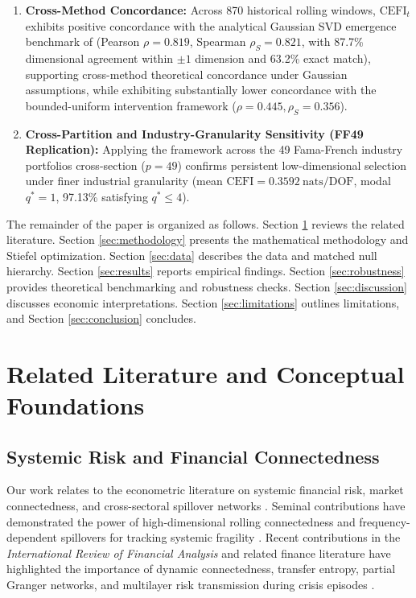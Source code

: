 \documentclass[review,12pt,authoryear]{elsarticle}
\begin{document}
\begin{enumerate}
    \item \textbf{Cross-Method Concordance:} Across 870 historical rolling windows, $\mathrm{CEFI}_t$ exhibits positive concordance with the analytical Gaussian SVD emergence benchmark of \citet{liu2025singular} (Pearson $\rho = 0.819$, Spearman $\rho_S = 0.821$, with 87.7\% dimensional agreement within $\pm 1$ dimension and 63.2\% exact match), supporting cross-method theoretical concordance under Gaussian assumptions, while exhibiting substantially lower concordance with the bounded-uniform intervention framework ($\rho = 0.445, \rho_S = 0.356$).
    \item \textbf{Cross-Partition and Industry-Granularity Sensitivity (FF49 Replication):} Applying the framework across the 49 Fama-French industry portfolios cross-section ($p=49$) confirms persistent low-dimensional selection under finer industrial granularity (mean $\mathrm{CEFI} = 0.3592\ \mathrm{nats/DOF}$, modal $q^* = 1$, 97.13\% satisfying $q^* \le 4$).
\end{enumerate}

The remainder of the paper is organized as follows. Section \ref{sec:literature} reviews the related literature. Section \ref{sec:methodology} presents the mathematical methodology and Stiefel optimization. Section \ref{sec:data} describes the data and matched null hierarchy. Section \ref{sec:results} reports empirical findings. Section \ref{sec:robustness} provides theoretical benchmarking and robustness checks. Section \ref{sec:discussion} discusses economic interpretations. Section \ref{sec:limitations} outlines limitations, and Section \ref{sec:conclusion} concludes.

\section{Related Literature and Conceptual Foundations}
\label{sec:literature}

\subsection{Systemic Risk and Financial Connectedness}
Our work relates to the econometric literature on systemic financial risk, market connectedness, and cross-sectoral spillover networks \citep{billio2012econometric, diebold2012better, diebold2014network, adrian2016covar, brownlees2017srisk}. Seminal contributions have demonstrated the power of high-dimensional rolling connectedness and frequency-dependent spillovers for tracking systemic fragility \citep{demirer2018estimating, barunik2018measuring}. Recent contributions in the \emph{International Review of Financial Analysis} and related finance literature have highlighted the importance of dynamic connectedness, transfer entropy, partial Granger networks, and multilayer risk transmission during crisis episodes \citep{ahelegbey2022network, yousaf2022linkages, mensi2021spillovers, bouri2021return, yang2023modeling, ardakani2024transfer, yao2025interindustry}. 
\end{document}
